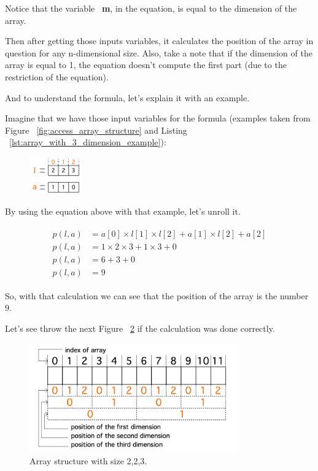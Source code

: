 \documentclass[
  oneside,
  11pt, a4paper,
  footinclude=true,
  headinclude=true,
  cleardoublepage=empty
]{scrbook}
\begin{document}
Notice that the variable ~\textbf{m}, in the equation, is equal to the dimension of the array.

Then after getting those inputs variables, it calculates the position of the array in question for any n-dimensional size.
Also, take a note that if the dimension of the array is equal to 1, the equation doesn't compute the first part (due to the restriction of the equation).

And to understand the formula, let's explain it with an example.

Imagine that we have those input variables for the formula (examples taken from Figure ~\ref{fig:access_array_structure} and Listing ~\ref{lst:array_with_3_dimension_example}):

\begin{figure}[h!]
  \centering
    \includegraphics[width=0.2\textwidth]{img/example_position_calculation.png}
    \label{fig:example_position_calculation_structure}
\end{figure}

By using the equation above with that example, let's unroll it.

\begin{equation}
 \begin{matrix}
 \begin{aligned}
  p(l,a) &= a[0] \times l[1] \times l[2] + a[1] \times l[2] + a[2] \\
  p(l,a) &= 1 \times 2 \times 3 + 1 \times 3 + 0 \\
  p(l,a) &= 6 + 3 + 0 \\
  p(l,a) &= 9
 \end{aligned}
 \end{matrix}
\end{equation}

So, with that calculation we can see that the position of the array is the number 9.

Let's see throw the next Figure ~\ref{fig:array_example_calculation} if the calculation was done correctly.

\begin{figure}[h!]
 \centering
  \includegraphics[width=0.8\textwidth]{img/array_example_calculation.png}
  \caption{Array structure with size 2,2,3.}
  \label{fig:array_example_calculation}
\end{figure}
\end{document}
